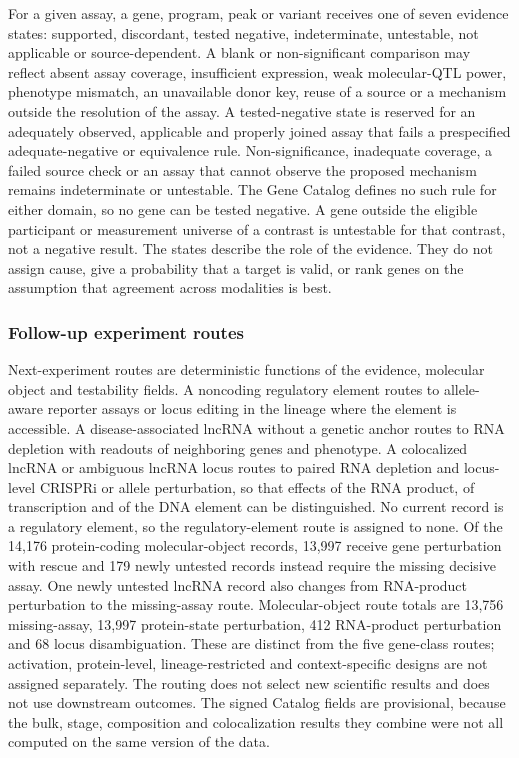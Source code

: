 For a given assay, a gene, program, peak or variant receives one of seven evidence states: supported, discordant, tested negative, indeterminate, untestable, not applicable or source-dependent. A blank or non-significant comparison may reflect absent assay coverage, insufficient expression, weak molecular-QTL power, phenotype mismatch, an unavailable donor key, reuse of a source or a mechanism outside the resolution of the assay. A tested-negative state is reserved for an adequately observed, applicable and properly joined assay that fails a prespecified adequate-negative or equivalence rule. Non-significance, inadequate coverage, a failed source check or an assay that cannot observe the proposed mechanism remains indeterminate or untestable. The Gene Catalog defines no such rule for either domain, so no gene can be tested negative. A gene outside the eligible participant or measurement universe of a contrast is untestable for that contrast, not a negative result. The states describe the role of the evidence. They do not assign cause, give a probability that a target is valid, or rank genes on the assumption that agreement across modalities is best.

\subsubsection{Follow-up experiment routes}\label{follow-up-experiment-routes}

Next-experiment routes are deterministic functions of the evidence, molecular object and testability fields. A noncoding regulatory element routes to allele-aware reporter assays or locus editing in the lineage where the element is accessible. A disease-associated lncRNA without a genetic anchor routes to RNA depletion with readouts of neighboring genes and phenotype. A colocalized lncRNA or ambiguous lncRNA locus routes to paired RNA depletion and locus-level CRISPRi or allele perturbation, so that effects of the RNA product, of transcription and of the DNA element can be distinguished. No current record is a regulatory element, so the regulatory-element route is assigned to none. Of the 14,176 protein-coding molecular-object records, 13,997 receive gene perturbation with rescue and 179 newly untested records instead require the missing decisive assay. One newly untested lncRNA record also changes from RNA-product perturbation to the missing-assay route. Molecular-object route totals are 13,756 missing-assay, 13,997 protein-state perturbation, 412 RNA-product perturbation and 68 locus disambiguation. These are distinct from the five gene-class routes; activation, protein-level, lineage-restricted and context-specific designs are not assigned separately. The routing does not select new scientific results and does not use downstream outcomes. The signed Catalog fields are provisional, because the bulk, stage, composition and colocalization results they combine were not all computed on the same version of the data.

